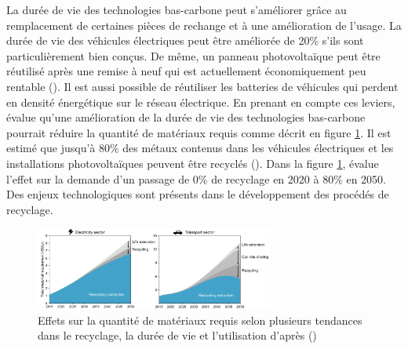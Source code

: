 La durée de vie des technologies bas-carbone peut s'améliorer grâce au remplacement de certaines pièces de rechange et à une amélioration de l'usage. La durée de vie des véhicules électriques peut être améliorée de 20\% s'ils sont particulièrement bien conçus. De même, un panneau photovoltaïque peut être réutilisé après une remise à neuf qui est actuellement économiquement peu rentable (\cite{watari_sustainable_2021}). Il est aussi possible de réutiliser les batteries de véhicules qui perdent en densité énergétique sur le réseau électrique. En prenant en compte ces leviers, \cite{watari_sustainable_2021} évalue qu'une amélioration de la durée de vie des technologies bas-carbone pourrait réduire la quantité de matériaux requis comme décrit en figure \ref{fig:recycle}.\smallbreak
Il est estimé que jusqu'à 80\% des métaux contenus dans les véhicules électriques et les installations photovoltaïques peuvent être recyclés (\cite{watari_sustainable_2021}). Dans la figure \ref{fig:recycle}, \cite{watari_sustainable_2021} évalue l'effet sur la demande d'un passage de 0\% de recyclage en 2020 à 80\% en 2050. Des enjeux technologiques sont présents dans le développement des procédés de recyclage.\smallbreak
\begin{figure}[!b]
    \centering
    \includegraphics[width=0.7\textwidth]{Images/supply_chain/recycling_scenario.png}
    \caption{Effets sur la quantité de matériaux requis selon plusieurs tendances dans le recyclage, la durée de vie et l'utilisation d'après (\cite{watari_sustainable_2021})}
    \label{fig:recycle}
\end{figure}


